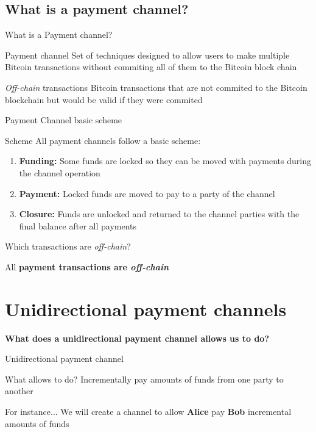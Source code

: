 \documentclass{beamer}
\begin{document}
\subsection{What is a payment channel?}
\begin{frame}{What is a Payment channel?}
 \begin{block}{Payment channel}
  Set of techniques designed to allow users to make multiple Bitcoin transactions without commiting all of them to the Bitcoin block chain
 \end{block}
 \pause
 \begin{block}{\textit{Off-chain} transactions}
  Bitcoin transactions that are not commited to the Bitcoin blockchain but would be valid if they were commited
 \end{block}
\end{frame}
\begin{frame}{Payment Channel basic scheme}
 \begin{block}{Scheme}
  All payment channels follow a basic scheme:
  \pause
  \begin{enumerate}[<+->]
   \item \textbf{Funding:} Some funds are locked so they can be moved with payments during the channel operation
   \item \textbf{Payment:} Locked funds are moved to pay to a party of the channel
   \item \textbf{Closure:} Funds are unlocked and returned to the channel parties with the final balance after all payments
  \end{enumerate}
 \end{block}
 \pause
 \begin{block}{Which transactions are \textit{off-chain}?}
  \begin{center}
   All \textbf{payment transactions are \textit{off-chain}}
  \end{center}
 \end{block}
\end{frame}
\section{Unidirectional payment channels}
\begin{frame}
 \begin{center}
  \textbf{What does a unidirectional payment channel allows us to do?}\\
 \end{center}
\end{frame}
\begin{frame}{Unidirectional payment channel}
 \begin{block}{What allows to do?}
  Incrementally pay amounts of funds from one party to another
 \end{block}
 \pause
 \begin{exampleblock}{For instance...}
  We will create a channel to allow \textbf{Alice} pay \textbf{Bob} incremental amounts of funds
 \end{exampleblock}
\end{frame}
\end{document}
